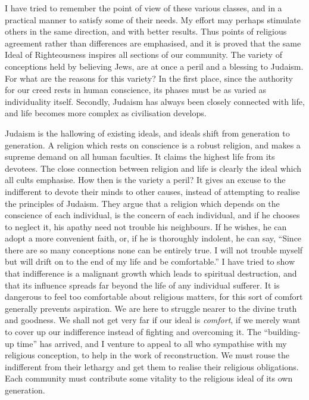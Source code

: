 I have tried to remember the point of
view of these various classes, and in a
practical manner to satisfy some of their
needs. My effort may perhaps stimulate
others in the same direction, and with better
results. Thus points of religious agreement
rather than differences are emphasised,
and it is proved that the same Ideal of
Righteousness inspires all sections of our
community. The variety of conceptions
held by believing Jews, are at once a peril
and a blessing to Judaism. For what are
the reasons for this variety? In the first
place, since the authority for our creed rests
in human conscience, its phases must be as
varied as individuality itself. Secondly,
Judaism has always been closely connected
with life, and life becomes more complex as
civilisation develops.

Judaism is the hallowing of existing ideals,
and ideals shift from generation to generation.
A religion which rests on conscience is a
robust religion, and makes a supreme
demand on all human faculties. It claims
the highest life from its devotees. The
close connection between religion and life is
clearly the ideal which all cults emphasise.
How then is the variety a peril? It gives
an excuse to the indifferent to devote their
minds to other causes, instead of attempting
to realise the principles of Judaism. They
argue that a religion which depends on the
conscience of each individual, is the concern
of each individual, and if he chooses to
neglect it, his apathy need not trouble his
neighbours. If he wishes, he can adopt a
more convenient faith, or, if he is thoroughly
indolent, he can say, “Since there are so
many conceptions none can be entirely true.
I will not trouble myself but will drift on to
the end of my life and be comfortable.” I
have tried to show that indifference is a
malignant growth which leads to spiritual
destruction, and that its influence spreads
far beyond the life of any individual sufferer.
It is dangerous to feel too comfortable about
religious matters, for this sort of comfort
generally prevents aspiration. We are here
to struggle nearer to the divine truth and
goodness. We shall not get very far if our
ideal is \textsl{comfort}, if we merely want to cover
up our indifference instead of fighting and
overcoming it. The “building-up time”
has arrived, and I venture to appeal to all
who sympathise with my religious conception,
to help in the work of reconstruction.
We must rouse the indifferent from their
lethargy and get them to realise their
religious obligations. Each community
must contribute some vitality to the religious
ideal of its own generation.

